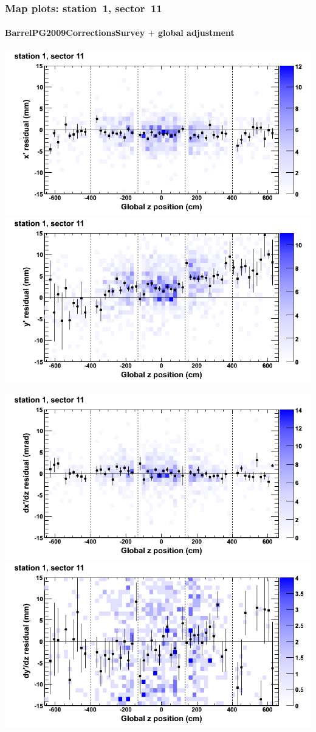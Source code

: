 \documentclass[compress]{beamer}
\begin{document}
\begin{frame}
\frametitle{Map plots: station~1, sector~11}
\framesubtitle{BarrelPG2009CorrectionsSurvey $+$ global adjustment}
\includegraphics[width=0.5\linewidth]{mapplots_re01/DTvsz_st1sec11_x.png}
\includegraphics[width=0.5\linewidth]{mapplots_re01/DTvsz_st1sec11_y.png}

\includegraphics[width=0.5\linewidth]{mapplots_re01/DTvsz_st1sec11_dxdz.png}
\includegraphics[width=0.5\linewidth]{mapplots_re01/DTvsz_st1sec11_dydz.png}
\end{frame}
\end{document}
